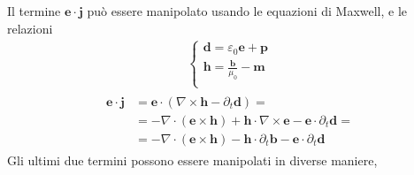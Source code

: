\documentclass[letterpaper,10pt,english]{jupyterBook}
\begin{document}
\sphinxAtStartPar
Il termine \(\mathbf{e} \cdot \mathbf{j}\) può essere manipolato usando le equazioni di Maxwell, e le relazioni
\begin{equation*}
\begin{split}\begin{cases}
  \mathbf{d} = \varepsilon_0 \mathbf{e} + \mathbf{p} \\
  \mathbf{h} = \frac{\mathbf{b}}{\mu_0} - \mathbf{m} \\
\end{cases}\end{split}
\end{equation*}\begin{equation*}
\begin{split}\begin{aligned}
  \mathbf{e} \cdot \mathbf{j} 
    & = \mathbf{e} \cdot \left( \nabla \times \mathbf{h} - \partial_t \mathbf{d} \right) = \\
    & = - \nabla \cdot \left( \mathbf{e} \times \mathbf{h} \right) + \mathbf{h} \cdot \nabla \times \mathbf{e} - \mathbf{e} \cdot \partial_t \mathbf{d} = \\
    & = - \nabla \cdot \left( \mathbf{e} \times \mathbf{h} \right) - \mathbf{h} \cdot \partial_t \mathbf{b} - \mathbf{e} \cdot \partial_t \mathbf{d} 
\end{aligned}\end{split}
\end{equation*}
\sphinxAtStartPar
Gli ultimi due termini possono essere manipolati in diverse maniere,
\end{document}
